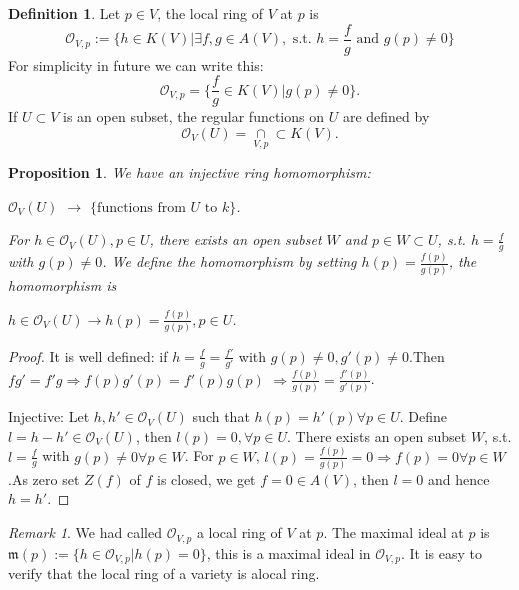 \documentclass{amsart}
\theoremstyle{plain}
\newtheorem{proposition}{Proposition}
\theoremstyle{definition}
\newtheorem{definition}{Definition}
\theoremstyle{remark}
\newtheorem*{remark}{Remark}
\numberwithin{equation}{section}
\begin{document}
\begin{definition}
	Let $ p\in V $, the local ring of $ V $ at $ p $ is 
	\begin{equation}
	\mathcal{O}_{V,p}:=\{h \in K(V)|\exists f,g\in A(V), \text{ s.t. } h=\frac{f}{g} \text{ and } g(p)\neq 0 \}
	\end{equation}
	For simplicity in future we can write this:
	\begin{equation}
	\mathcal{O}_{V,p}=\{ \frac{f}{g}\in K(V)|g(p)\neq 0 \}.
	\end{equation}
	If $ U\subset V $ is an open subset, the regular functions on $ U $ are defined by
	\begin{equation}
	\mathcal{O}_V(U)=\mathop{\cap}\limits_{V,p}\subset K(V).
	\end{equation}
\end{definition}
\begin{proposition}
	We have an injective ring homomorphism:\begin{center}
		$ \mathcal{O}_V(U) $ $ \to $ $ \{ \text{functions from }U \text{ to } k \} $. 
	\end{center}
	For $ h\in \mathcal{O}_V(U),p\in U $, there exists an open subset $ W $ and $ p\in W\subset U $, s.t. $ h=\frac{f}{g} $ with $ g(p)\neq 0 $. We define the homomorphism by setting $ h(p)=\frac{f(p)}{g(p)} $, the homomorphism is
	\begin{center}
		$ h\in \mathcal{O}_V(U)\to h(p)=\frac{f(p)}{g(p)}, p\in U $.
	\end{center}
\end{proposition}
\begin{proof}
	It is well defined: if $ h=\frac{f}{g}=\frac{f'}{g'} $ with $ g(p)\neq 0,g'(p)\neq 0 $.Then $ fg'=f'g \Rightarrow f(p)g'(p)=f'(p)g(p)$ $ \Rightarrow \frac{f(p)}{g(p)}=\frac{f'(p)}{g'(p)} $.
	
	Injective: Let $ h,h'\in \mathcal{O}_V(U) $ such that $ h(p)=h'(p) \forall p\in U$.
	Define $ l=h-h'\in \mathcal{O}_V(U) $, then $ l(p)=0 ,\forall p\in U$. There exists an open subset $ W $, s.t. $ l=\frac{f}{g} $ with $ g(p)\neq 0 \forall p\in W $. For $ p\in W $, $ l(p)=\frac{f(p)}{g(p)}=0\Rightarrow f(p)=0 \forall p\in W $.As zero set $ Z(f) $ of $ f $ is closed, we get $ f=0\in A(V) $, then $ l=0 $ and hence $ h=h' $.
\end{proof}
\begin{remark}
	We had called $ \mathcal{O}_{V,p} $ a local ring of $ V $ at $ p $. The maximal ideal at $ p $ is $ \mathfrak{m}(p):=\{ h\in \mathcal{O}_{V,p}|h(p)=0 \} $, this is a maximal ideal in $ \mathcal{O}_{V,p} $. It is easy to verify that the local ring of a variety is alocal ring.
\end{remark}
\end{document}
